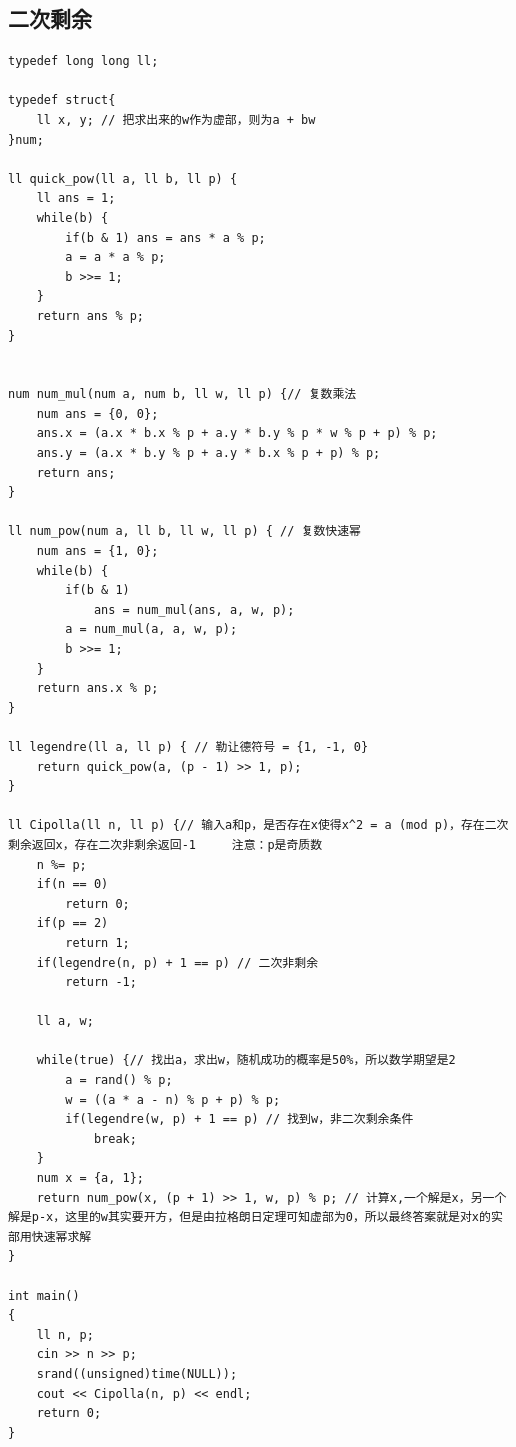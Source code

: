 \documentclass[twoside]{article}
\begin{document}
\subsection{二次剩余}
\begin{lstlisting}
typedef long long ll;

typedef struct{
    ll x, y; // 把求出来的w作为虚部，则为a + bw
}num;

ll quick_pow(ll a, ll b, ll p) {
    ll ans = 1;
    while(b) {
        if(b & 1) ans = ans * a % p;
        a = a * a % p;
        b >>= 1;
    }
    return ans % p;
}


num num_mul(num a, num b, ll w, ll p) {// 复数乘法
    num ans = {0, 0};
    ans.x = (a.x * b.x % p + a.y * b.y % p * w % p + p) % p;
    ans.y = (a.x * b.y % p + a.y * b.x % p + p) % p;
    return ans;
} 

ll num_pow(num a, ll b, ll w, ll p) { // 复数快速幂
    num ans = {1, 0};
    while(b) {
        if(b & 1)
            ans = num_mul(ans, a, w, p);
        a = num_mul(a, a, w, p);
        b >>= 1;
    }
    return ans.x % p;
}

ll legendre(ll a, ll p) { // 勒让德符号 = {1, -1, 0}
    return quick_pow(a, (p - 1) >> 1, p);
}

ll Cipolla(ll n, ll p) {// 输入a和p，是否存在x使得x^2 = a (mod p)，存在二次剩余返回x，存在二次非剩余返回-1     注意：p是奇质数
    n %= p;
    if(n == 0)
        return 0;
    if(p == 2)
        return 1;
    if(legendre(n, p) + 1 == p) // 二次非剩余
        return -1;
    
    ll a, w; 
    
    while(true) {// 找出a，求出w，随机成功的概率是50%，所以数学期望是2
        a = rand() % p;
        w = ((a * a - n) % p + p) % p;
        if(legendre(w, p) + 1 == p) // 找到w，非二次剩余条件
            break;
    }
    num x = {a, 1};   
    return num_pow(x, (p + 1) >> 1, w, p) % p; // 计算x,一个解是x，另一个解是p-x，这里的w其实要开方，但是由拉格朗日定理可知虚部为0，所以最终答案就是对x的实部用快速幂求解
}

int main()
{
    ll n, p;
    cin >> n >> p;
    srand((unsigned)time(NULL));
    cout << Cipolla(n, p) << endl;
    return 0;
}\end{lstlisting}
\end{document}
